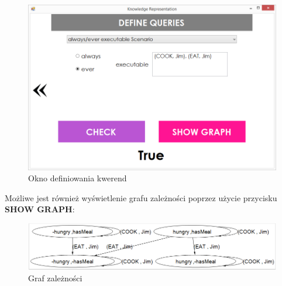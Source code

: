\documentclass{article}
\begin{document}
\begin{figure}[H]
\centering
\includegraphics[scale=0.4]{13}
\caption{Okno definiowania kwerend}
\end{figure}

\newpage

Możliwe jest również wyświetlenie grafu zależności poprzez użycie przycisku  \textbf{SHOW GRAPH}:

\begin{figure}[H]
\centering
\includegraphics[scale=0.4]{14}
\caption{Graf zależności}
\end{figure}
\end{document}
